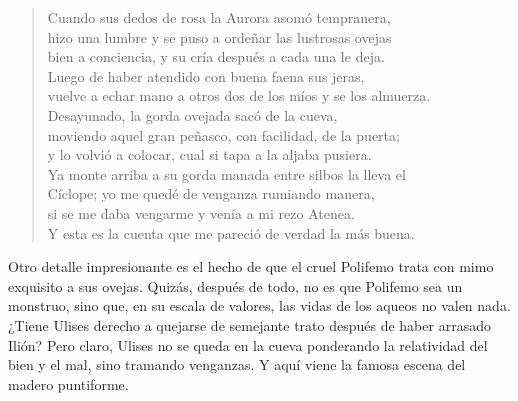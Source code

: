 \documentclass[11pt,a4paper]{article}
\begin{document}
\begin{verse}
Cuando sus dedos de rosa la Aurora asomó tempranera,\\
hizo una lumbre y se puso a ordeñar las lustrosas ovejas\\
bien a conciencia, y su cría después a cada una le deja.\\
Luego de haber atendido con buena faena sus jeras,\\
vuelve a echar mano a otros dos de los míos y se los almuerza.\\
Desayunado, la gorda ovejada sacó de la cueva,\\
moviendo aquel gran peñasco, con facilidad, de la puerta;\\
y lo volvió a colocar, cual si tapa a la aljaba pusiera.\\
Ya monte arriba a su gorda manada entre silbos la lleva el\\
Cíclope; yo me quedé de venganza rumiando manera,\\
si se me daba vengarme y venía a mi rezo Atenea.\\
Y esta es la cuenta que me pareció de verdad la más buena.
\end{verse}

Otro detalle impresionante es el hecho de que el cruel Polifemo trata con mimo exquisito a sus ovejas. Quizás, después de todo, no es que Polifemo sea un monstruo, sino que, en su escala de valores, las vidas de los aqueos no valen nada. ¿Tiene Ulises derecho a quejarse de semejante trato después de haber arrasado Ilión? Pero claro, Ulises no se queda en la cueva ponderando la relatividad del bien y el mal, sino tramando venganzas. Y aquí viene la famosa escena del madero puntiforme.
\end{document}
